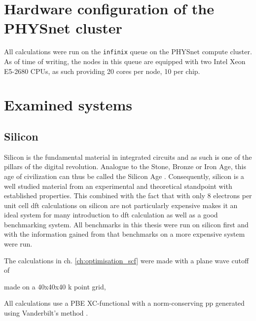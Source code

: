 \documentclass[main.tex]{subfiles}
\begin{document}

\section{Hardware configuration of the PHYSnet cluster}\label{sec:hardware_physnet}

All calculations were run on the \texttt{infinix} queue on the PHYSnet compute cluster. 
As of time of writing, the nodes in this queue are equipped with two Intel Xeon E5-2680 CPUs, as such providing 20 cores per node, 10 per chip.



\section{Examined systems}

\subsection{Silicon}

Silicon is the fundamental material in integrated circuits and as such is one of the pillars of the digital revolution.
Analogue to the Stone, Bronze or Iron Age, this age of civilization can thus be called the Silicon Age \cite{chabal_fundamental_2001}.
Consequently, silicon is a well studied material from an experimental and theoretical standpoint with established properties.
This combined with the fact that with only 8 electrons per unit cell \acrshort{dft} calculations on silicon are not particularly expensive makes it an ideal system for many introduction to \acrshort{dft} calculation as well as a good benchmarking system.
All benchmarks in this thesis were run on silicon first and with the information gained from that benchmarks on a more expensive system were run.

The calculations in ch. \ref{ch:optimisation_scf} were made with a plane wave cutoff of

made on a 40x40x40 k point grid, 

All calculations use a PBE XC-functional with a norm-conserving \acrshort{pp} generated using Vanderbilt's method \cite{hamann_erratum_2017}.


\subsection{\TaS}
\end{document}
